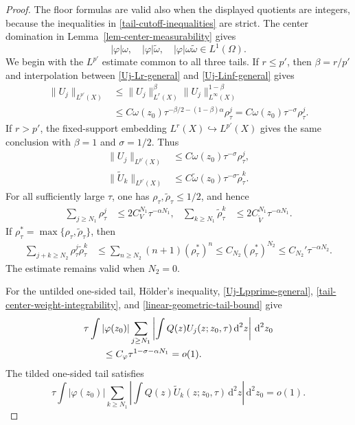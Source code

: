 \documentclass[a4paper,11pt]{article}
\newcommand{\dd}{\,\text{d}}
\theoremstyle{plain}
\theoremstyle{definition}
\theoremstyle{remark}
\begin{document}
\begin{proof}
The floor formulas are valid also when the displayed quotients are integers, because the inequalities in \eqref{tail-cutoff-inequalities} are strict.  The center domination in Lemma~\ref{lem-center-measurability} gives
\begin{equation}\label{tail-center-weight-integrability}
 |\varphi|\omega,
 \quad |\varphi|\widetilde\omega,
 \quad |\varphi|\omega\widetilde\omega
 \in L^1(\Omega).
\end{equation}
We begin with the $L^{p'}$ estimate common to all three tails.  If $r\leq p'$, then $\beta=r/p'$ and interpolation between \eqref{Uj-Lr-general} and \eqref{Uj-Linf-general} gives
\begin{align*}
 \|U_j\|_{L^{p'}(X)}
 &\leq
 \|U_j\|_{L^r(X)}^{\beta}
 \|U_j\|_{L^\infty(X)}^{1-\beta}\\
 &\leq
 C\omega(z_0)\tau^{-\beta/2-(1-\beta)\alpha}\rho_\tau^j
 =C\omega(z_0)\tau^{-\sigma}\rho_\tau^j.
\end{align*}
If $r>p'$, the fixed-support embedding $L^r(X)\hookrightarrow L^{p'}(X)$ gives the same conclusion with $\beta=1$ and $\sigma=1/2$.  Thus
\begin{align}
 \|U_j\|_{L^{p'}(X)}
 &\leq C\omega(z_0)\tau^{-\sigma}\rho_\tau^j,
 \label{Uj-Lpprime-general}\\
 \|\widetilde U_k\|_{L^{p'}(X)}
 &\leq C\widetilde\omega(z_0)\tau^{-\sigma}
          \widetilde\rho_\tau^k.
 \label{tilde-Uj-Lpprime-general}
\end{align}
For all sufficiently large $\tau$, one has $\rho_\tau,\widetilde\rho_\tau\leq1/2$, and hence
\begin{align}
 \sum_{j\geq N_1}\rho_\tau^j
 &\leq 2C_V^{N_1}\tau^{-\alpha N_1},
 &
 \sum_{k\geq N_1}\widetilde\rho_\tau^k
 &\leq 2C_{\widetilde V}^{N_1}\tau^{-\alpha N_1}.
 \label{linear-geometric-tail-bound}
\end{align}
If $\rho_\tau^\ast=\max\{\rho_\tau,\widetilde\rho_\tau\}$, then
\begin{align}
 \sum_{j+k\geq N_2}\rho_\tau^j\widetilde\rho_\tau^k
 &\leq \sum_{n\geq N_2}(n+1)(\rho_\tau^\ast)^n
 \leq C_{N_2}(\rho_\tau^\ast)^{N_2}
 \leq C_{N_2}'\tau^{-\alpha N_2}.
 \label{mixed-geometric-tail-bound}
\end{align}
The estimate remains valid when $N_2=0$.

For the untilded one-sided tail, H\"older's inequality, \eqref{Uj-Lpprime-general}, \eqref{tail-center-weight-integrability}, and \eqref{linear-geometric-tail-bound} give
\begin{align}
 &\tau\int |\varphi(z_0)|
 \sum_{j\geq N_1}
 \left|\int Q(z)U_j(z;z_0,\tau)\dd^2z\right|\dd^2z_0
 \notag\\
 &\qquad\leq C_\varphi\tau^{1-\sigma-\alpha N_1}=o(1).
 \label{left-linear-tail-decay}
\end{align}
The tilded one-sided tail satisfies
\begin{equation}\label{right-linear-tail-decay}
 \tau\int |\varphi(z_0)|
 \sum_{k\geq N_1}
 \left|\int Q(z)\widetilde U_k(z;z_0,\tau)\dd^2z\right|\dd^2z_0
 =o(1).
\end{equation}


\end{proof}
\end{document}
